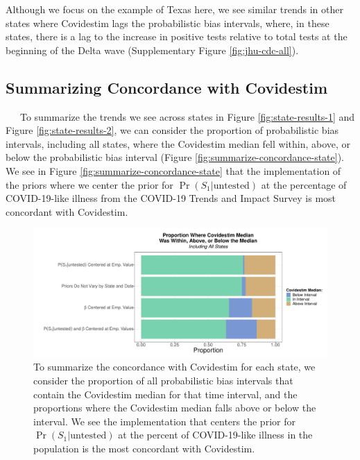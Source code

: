 \documentclass[12pt,twoside]{smiththesis}
\begin{document}
Although we focus on the example of Texas here, we see similar trends in other states where Covidestim lags the probabilistic bias intervals, where, in these states, there is a lag to the increase in positive tests relative to total tests at the beginning of the Delta wave (Supplementary Figure \ref{fig:jhu-cdc-all}).

\newpage

\hypertarget{summarizing-concordance-with-covidestim}{%
\subsection{Summarizing Concordance with Covidestim}\label{summarizing-concordance-with-covidestim}}

~~~To summarize the trends we see across states in Figure \ref{fig:state-results-1} and Figure \ref{fig:state-results-2}, we can consider the proportion of probabilistic bias intervals, including all states, where the Covidestim median fell within, above, or below the probabilistic bias interval (Figure \ref{fig:summarize-concordance-state}). We see in Figure \ref{fig:summarize-concordance-state} that the implementation of the priors where we center the prior for \(\Pr(S_1|\text{untested})\) at the percentage of COVID-19-like illness from the COVID-19 Trends and Impact Survey is most concordant with Covidestim.
\begin{figure}
\includegraphics[width=1\linewidth]{figure/covidestim_concordance_state} \caption{\label{fig:summarize-concordance-state} To summarize the concordance with Covidestim for each state, we consider the proportion of all probabilistic bias intervals that contain the Covidestim median for that time interval, and the proportions where the Covidestim median falls above or below the interval. We see the implementation that centers the prior for $\Pr(S_1|\text{untested})$ at the percent of COVID-19-like illness in the population is the most concordant with Covidestim.}\label{fig:unnamed-chunk-71}
\end{figure}
\newpage
\end{document}
